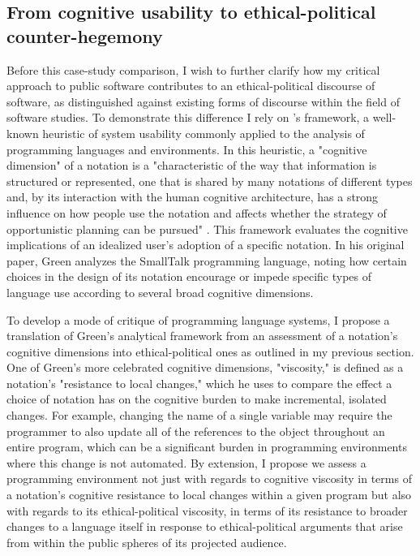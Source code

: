 \subsection*{From cognitive usability to ethical-political counter-hegemony}
Before this case-study comparison, I wish to further clarify how my critical approach to public software contributes to an ethical-political discourse of software, as distinguished against existing forms of discourse within the field of software studies. To demonstrate this difference I rely on \citeauthor{Green1989}'s  framework, a well-known heuristic of system usability commonly applied to the analysis of programming languages and environments. In this heuristic, a "cognitive dimension" of a notation is a "characteristic of the way that information is structured or represented, one that is shared by many notations of different types and, by its interaction with the human cognitive architecture, has a strong influence on how people use the notation and affects whether the strategy of opportunistic planning can be pursued" \autocite[448]{Green1989}. This framework evaluates the cognitive implications of an idealized user's adoption of a specific notation. In his original paper, Green analyzes the SmallTalk programming language, noting how certain choices in the design of its notation encourage or impede specific types of language use according to several broad cognitive dimensions.

To develop a mode of critique of programming language systems, I propose a translation of Green's analytical framework from an assessment of a notation's cognitive dimensions into ethical-political ones as outlined in my previous section. One of Green's more celebrated cognitive dimensions, "viscosity," is defined as a notation's "resistance to local changes," which he uses to compare the effect a choice of notation has on the cognitive burden to make incremental, isolated changes. For example, changing the name of a single variable may require the programmer to also update all of the references to the object throughout an entire program, which can be a significant burden in programming environments where this change is not automated. By extension, I propose we assess a programming environment not just with regards to cognitive viscosity in terms of a notation's cognitive resistance to local changes within a given program but also with regards to its ethical-political viscosity, in terms of its resistance to broader changes to a language itself in response to ethical-political arguments that arise from within the public spheres of its projected audience.

